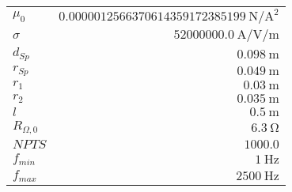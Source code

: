 
{%
    \begin{center}
    \label{tab:fitparams:cu:R}
    \begin{tabular}{lr}
    \toprule
        $\mu_0$ & $\SI{0.0000012566370614359172385199}{\newton\per\ampere\squared}$\\
        $\sigma$ & $\SI{52000000.0}{\ampere\per\volt\per\meter}$\\
        $d_{Sp}$ & $\SI{0.098}{\meter}$\\
        $r_{Sp}$ & $\SI{0.049}{\meter}$\\
        $r_1$ & $\SI{0.03}{\meter}$\\
        $r_2$ & $\SI{0.035}{\meter}$\\
        $l$ & $\SI{0.5}{\meter}$\\
        $R_{\Omega,0}$ & $\SI{6.3}{\ohm}$\\
        $NPTS$ & $\num{1000.0}$\\
        $f_{min}$ & $\SI{1}{\hertz}$\\
        $f_{max}$ & $\SI{2500}{\hertz}$\\

    \bottomrule
    \end{tabular}
    \end{center}
}

